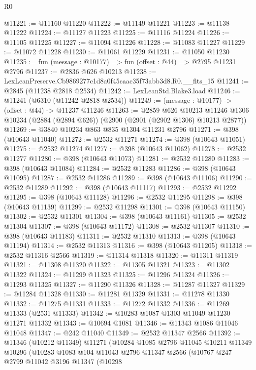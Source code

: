 \begin{lexlean}{R0}
\begin{coremodule}
@11221 := @11160 @11220
@11222 := @11149 @11221
@11223 := @11138 @11222
@11224 := @11127 @11223
@11225 := @11116 @11224
@11226 := @11105 @11225
@11227 := @11094 @11226
@11228 := @11083 @11227
@11229 := @11072 @11228
@11230 := @11061 @11229
@11231 := @11050 @11230
@11235 := fun (message : @10177) => fun (offset : @44) => @2795 @11231 @2796
@11237 := @2836 @626 @10213
@11238 := LexLeanPreserve.Cb9869277c1d8a0f45caac35f73abb3d8.R0.__fits_15
@11241 := @2845 (@11238 @2818 @2534)
@11242 := LexLeanStd.Blake3.load
@11246 := @11241 (@6310 (@11242 @2818 @2534))
@11249 := (message : @10177) -> (offset : @44) -> @11237 @11246
@11263 := @2859
    @626
    @10213
    @11246
    @1306
    @10234
    (@2884 (@2894 @626))
    (@2900 (@2901 (@2902 @1306) @10213 @2877))
@11269 := @3840 @10234 @863 @835 @1304 @11231 @2796
@11271 := @398 (@10643 @11040)
@11272 := @2532 @11271
@11274 := @398 (@10643 @11051)
@11275 := @2532 @11274
@11277 := @398 (@10643 @11062)
@11278 := @2532 @11277
@11280 := @398 (@10643 @11073)
@11281 := @2532 @11280
@11283 := @398 (@10643 @11084)
@11284 := @2532 @11283
@11286 := @398 (@10643 @11095)
@11287 := @2532 @11286
@11289 := @398 (@10643 @11106)
@11290 := @2532 @11289
@11292 := @398 (@10643 @11117)
@11293 := @2532 @11292
@11295 := @398 (@10643 @11128)
@11296 := @2532 @11295
@11298 := @398 (@10643 @11139)
@11299 := @2532 @11298
@11301 := @398 (@10643 @11150)
@11302 := @2532 @11301
@11304 := @398 (@10643 @11161)
@11305 := @2532 @11304
@11307 := @398 (@10643 @11172)
@11308 := @2532 @11307
@11310 := @398 (@10643 @11183)
@11311 := @2532 @11310
@11313 := @398 (@10643 @11194)
@11314 := @2532 @11313
@11316 := @398 (@10643 @11205)
@11318 := @2532 @11316 @2566
@11319 := @11314 @11318
@11320 := @11311 @11319
@11321 := @11308 @11320
@11322 := @11305 @11321
@11323 := @11302 @11322
@11324 := @11299 @11323
@11325 := @11296 @11324
@11326 := @11293 @11325
@11327 := @11290 @11326
@11328 := @11287 @11327
@11329 := @11284 @11328
@11330 := @11281 @11329
@11331 := @11278 @11330
@11332 := @11275 @11331
@11333 := @11272 @11332
@11336 := @11269 @11333 (@2531 @11333)
@11342 := @10283 @1087 @1303 @11049 @11230 @11271 @11332
@11343 := @10694 @1081
@11346 := @11343 @1086 @11046 @11048
@11347 := @242 @11040
@11349 := @2532 @11347 @2566
@11392 := @11346
    (@10212 @11349)
    @11271
    (@10284
      @1085
      @2796
      @11045
      @10211
      @11349
      @10296
      (@10283
        @1083
        @104
        @11043
        @2796
        @11347
        @2566
        (@10767
          @247
          @2799
          @11042
          @3196
          @11347
          (@10298

\end{coremodule}
\end{lexlean}

